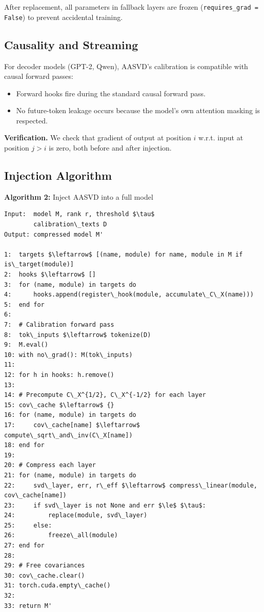 After replacement, all parameters in fallback layers are frozen 
(\texttt{requires\_grad = False}) to prevent accidental training.

\subsection{Causality and Streaming}

For decoder models (GPT-2, Qwen), AASVD's calibration is compatible with 
causal forward passes:

\begin{itemize}
\item Forward hooks fire during the standard causal forward pass.
\item No future-token leakage occurs because the model's own attention
  masking is respected.

\end{itemize}
\textbf{Verification.} We check that gradient of output at position $i$ w.r.t. 
input at position $j > i$ is zero, both before and after injection.

\subsection{Injection Algorithm}

\textbf{Algorithm 2:} Inject AASVD into a full model
\begin{lstlisting}
Input:  model M, rank r, threshold $\tau$
        calibration\_texts D
Output: compressed model M'

1:  targets $\leftarrow$ [(name, module) for name, module in M if is\_target(module)]
2:  hooks $\leftarrow$ []
3:  for (name, module) in targets do
4:      hooks.append(register\_hook(module, accumulate\_C\_X(name)))
5:  end for
6:
7:  # Calibration forward pass
8:  tok\_inputs $\leftarrow$ tokenize(D)
9:  M.eval()
10: with no\_grad(): M(tok\_inputs)
11:
12: for h in hooks: h.remove()
13:
14: # Precompute C\_X^{1/2}, C\_X^{-1/2} for each layer
15: cov\_cache $\leftarrow$ {}
16: for (name, module) in targets do
17:     cov\_cache[name] $\leftarrow$ compute\_sqrt\_and\_inv(C\_X[name])
18: end for
19:
20: # Compress each layer
21: for (name, module) in targets do
22:     svd\_layer, err, r\_eff $\leftarrow$ compress\_linear(module, cov\_cache[name])
23:     if svd\_layer is not None and err $\le$ $\tau$:
24:         replace(module, svd\_layer)
25:     else:
26:         freeze\_all(module)
27: end for
28:
29: # Free covariances
30: cov\_cache.clear()
31: torch.cuda.empty\_cache()
32:
33: return M'
\end{lstlisting}

